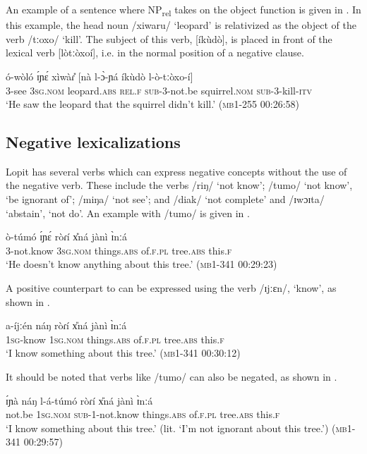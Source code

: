 \documentclass[output=paper,colorlinks,citecolor=brown,draftmode]{langscibook}
\begin{document}
An example of a sentence where NP\textsubscript{rel} takes on the object function is given in .  In this example, the head noun /xiwaru/ ‘leopard’ is relativized as the object of the verb /tːoxo/ ‘kill’.  The subject of this verb, [íkùdò], is placed in front of the lexical verb [lòtːòxoí], i.e. in the normal position of a negative clause.

\ea\label{ex:lop:59}
        \gll ó-wòló ɪ́ɲɛ́ xìwàɾ{\U} [nà l-ɔ̀-ɲá íkùdò l-ò-tːòxo-í] \\
             3-see 3\textsc{sg.nom} leopard.\textsc{abs} \textsc{rel.f} \textsc{sub-3-}not.be squirrel.\textsc{nom} \textsc{sub}{}-3-kill-\textsc{itv} \\
        \glt ‘He saw the leopard that the squirrel didn’t kill.’   (\textsc{mb1-255} \textsc{00}:26:58)
\z


\subsection{Negative lexicalizations}
\label{sec:lop:2.5}
Lopit has several verbs which can express negative concepts without the use of the negative verb. These include the verbs /riŋ/ ‘not know’; /tumo/ ‘not know’, ‘be ignorant of’; /miŋa/ ‘not see’; and /diak/ ‘not complete’ and /ɪwɔɪta/ ‘abstain’, ‘not do’. An example with /tumo/ is given in  .  

\ea\label{ex:lop:60}
        \gll ò-túmó ɪ́ɲɛ́ ròɾí x{\U}ná jànì ɪ̀nːá  \\
             3-not.know 3\textsc{sg.nom} things.\textsc{abs} of.\textsc{f.pl} tree.\textsc{abs} this.\textsc{f} \\
        \glt ‘He doesn’t know anything about this tree.’   (\textsc{mb1-341} \textsc{00:29}:23)
\z

A positive counterpart to  can be expressed using the verb /ɪjːɛn/, ‘know’, as shown in .

\ea\label{ex:lop:61}
        \gll a-íjːén náŋ ròɾí x{\U}ná jànì ɪ̀nːá \\
             1\textsc{sg}{}-know 1\textsc{sg.nom} things.\textsc{abs} of.\textsc{f.pl} tree.\textsc{abs} this.\textsc{f} \\
        \glt ‘I know something about this tree.’   (\textsc{mb1-341} \textsc{00:30}:12)
\z

It should be noted that verbs like /tumo/ can also be negated, as shown in .

\ea\label{ex:lop:62}
        \gll ɪ́ɲà náŋ l-á-túmó ròɾí x{\U}ná jànì ɪ̀nːá \\
             not.be 1\textsc{sg.nom} \textsc{sub-1}{}-not.know things.\textsc{abs} of.\textsc{f.pl} tree.\textsc{abs} this.\textsc{f} \\
        \glt ‘I know something about this tree.' (lit. `I’m not ignorant about this tree.’)  (\textsc{mb1-341} \textsc{00:29}:57)
\z
\end{document}
